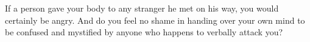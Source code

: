 If a person gave your body to any stranger he met on his way,
you would certainly be angry. And do you feel no shame in handing
over your own mind to be confused and mystified by anyone who happens
to verbally attack you? 
